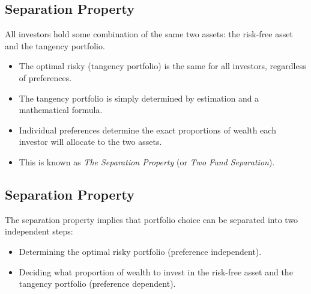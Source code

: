 \documentclass[letterpaper,10pt,english]{sphinxmanual}
\begin{document}
\subsection{Separation Property}
\label{multiAssetOpt:separation-property}
All investors hold some combination of the same two assets: the
risk-free asset and the tangency portfolio.
\begin{itemize}
\item {} 
The optimal risky (tangency portfolio) is the same for all
investors, regardless of preferences.

\end{itemize}
\begin{itemize}
\item {} 
The tangency portfolio is simply determined by estimation and a
mathematical formula.

\end{itemize}
\begin{itemize}
\item {} 
Individual preferences determine the exact proportions of wealth
each investor will allocate to the two assets.

\end{itemize}
\begin{itemize}
\item {} 
This is known as \emph{The Separation Property} (or \emph{Two Fund
Separation}).

\end{itemize}


\subsection{Separation Property}
\label{multiAssetOpt:id8}
The separation property implies that portfolio choice can be separated
into two independent steps:
\begin{itemize}
\item {} 
Determining the optimal risky portfolio (preference independent).

\end{itemize}
\begin{itemize}
\item {} 
Deciding what proportion of wealth to invest in the risk-free asset
and the tangency portfolio (preference dependent).

\end{itemize}
\end{document}
